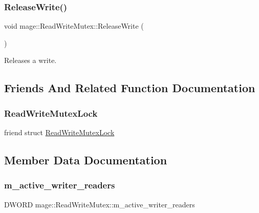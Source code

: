 \subsubsection{\texorpdfstring{Release\+Write()}{ReleaseWrite()}}
{\footnotesize\ttfamily void mage\+::\+Read\+Write\+Mutex\+::\+Release\+Write (\begin{DoxyParamCaption}{ }\end{DoxyParamCaption})\hspace{0.3cm}{\ttfamily [private]}}

Releases a write. 

\subsection{Friends And Related Function Documentation}
\hypertarget{structmage_1_1_read_write_mutex_a7ae207fc659160d3c55a5ba1468007f7}{}\label{structmage_1_1_read_write_mutex_a7ae207fc659160d3c55a5ba1468007f7} 
\subsubsection{\texorpdfstring{Read\+Write\+Mutex\+Lock}{ReadWriteMutexLock}}
{\footnotesize\ttfamily friend struct \hyperlink{structmage_1_1_read_write_mutex_lock}{Read\+Write\+Mutex\+Lock}\hspace{0.3cm}{\ttfamily [friend]}}



\subsection{Member Data Documentation}
\hypertarget{structmage_1_1_read_write_mutex_a1e0ad98e517236170faae5b27decfdce}{}\label{structmage_1_1_read_write_mutex_a1e0ad98e517236170faae5b27decfdce} 
\subsubsection{\texorpdfstring{m\+\_\+active\+\_\+writer\+\_\+readers}{m\_active\_writer\_readers}}
{\footnotesize\ttfamily D\+W\+O\+RD mage\+::\+Read\+Write\+Mutex\+::m\+\_\+active\+\_\+writer\+\_\+readers\hspace{0.3cm}{\ttfamily [private]}}

